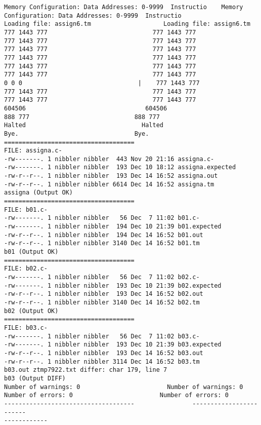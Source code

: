 \documentclass[12pt]{book}
\begin{document}
\begin{lstlisting}
Memory Configuration: Data Addresses: 0-9999  Instructio    Memory 
Configuration: Data Addresses: 0-9999  Instructio
Loading file: assign6.tm                    Loading file: assign6.tm
777 1443 777                             777 1443 777 
777 1443 777                             777 1443 777 
777 1443 777                             777 1443 777 
777 1443 777                             777 1443 777 
777 1443 777                             777 1443 777 
777 1443 777                             777 1443 777 
0 0 0                                |    777 1443 777 
777 1443 777                             777 1443 777 
777 1443 777                             777 1443 777 
604506                                 604506 
888 777                             888 777 
Halted                                Halted
Bye.                                Bye.
====================================
FILE: assigna.c-
-rw-------. 1 nibbler nibbler  443 Nov 20 21:16 assigna.c-
-rw-------. 1 nibbler nibbler  193 Dec 10 18:12 assigna.expected
-rw-r--r--. 1 nibbler nibbler  193 Dec 14 16:52 assigna.out
-rw-r--r--. 1 nibbler nibbler 6614 Dec 14 16:52 assigna.tm
assigna (Output OK)
====================================
FILE: b01.c-
-rw-------. 1 nibbler nibbler   56 Dec  7 11:02 b01.c-
-rw-------. 1 nibbler nibbler  194 Dec 10 21:39 b01.expected
-rw-r--r--. 1 nibbler nibbler  194 Dec 14 16:52 b01.out
-rw-r--r--. 1 nibbler nibbler 3140 Dec 14 16:52 b01.tm
b01 (Output OK)
====================================
FILE: b02.c-
-rw-------. 1 nibbler nibbler   56 Dec  7 11:02 b02.c-
-rw-------. 1 nibbler nibbler  193 Dec 10 21:39 b02.expected
-rw-r--r--. 1 nibbler nibbler  193 Dec 14 16:52 b02.out
-rw-r--r--. 1 nibbler nibbler 3140 Dec 14 16:52 b02.tm
b02 (Output OK)
====================================
FILE: b03.c-
-rw-------. 1 nibbler nibbler   56 Dec  7 11:02 b03.c-
-rw-------. 1 nibbler nibbler  193 Dec 10 21:39 b03.expected
-rw-r--r--. 1 nibbler nibbler  193 Dec 14 16:52 b03.out
-rw-r--r--. 1 nibbler nibbler 3114 Dec 14 16:52 b03.tm
b03.out ztmp7922.txt differ: char 179, line 7
b03 (Output DIFF)
Number of warnings: 0                        Number of warnings: 0
Number of errors: 0                        Number of errors: 0
------------------------------------                ------------------------
------------


\end{lstlisting}
\end{document}
